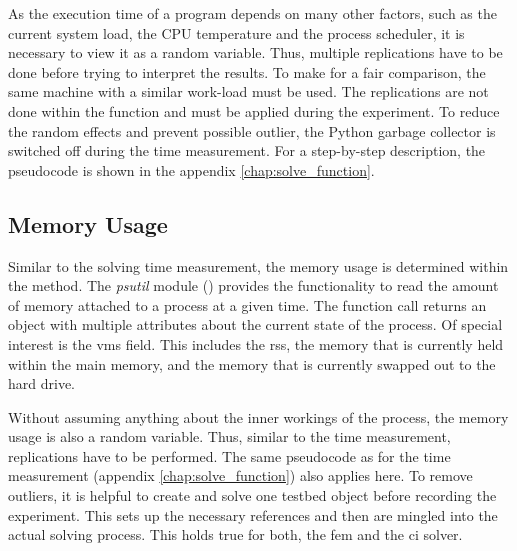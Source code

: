 \documentclass[./\jobname.tex]{subfiles}
\begin{document}
As the execution time of a program depends on many other factors, such as the current system load, the CPU temperature and the process scheduler, it is necessary to view it as a random variable. Thus, multiple replications have to be done before trying to interpret the results. To make for a fair comparison, the same machine with a similar work-load must be used.  The replications are not done within the  function and must be applied during the experiment. To reduce the random effects and prevent possible outlier, the Python garbage collector is switched off during the time measurement. For a step-by-step description, the pseudocode is shown in the appendix \ref{chap:solve_function}. 



\subsection{Memory Usage}
\label{chap:metric_mem}
Similar to the solving time measurement, the memory usage is determined within the  method. The \textit{psutil} module (\cite{rodola_psutil_2020}) provides the functionality to read the amount of memory attached to a process at a given time. The function call  returns an object with multiple attributes about the current state of the process. Of special interest is the \gls{vms} field. This includes the \gls{rss}, the memory that is currently held within the main memory, and the memory that is currently swapped out to the hard drive.

Without assuming anything about the inner workings of the process, the memory usage is also a random variable. Thus, similar to the time measurement, replications have to be performed. The same pseudocode as for the time measurement (appendix \ref{chap:solve_function}) also applies here. To remove outliers, it is helpful to create and solve one testbed object before recording the experiment. This sets up the necessary references and then are mingled into the actual solving process. This holds true for both, the \gls{fem} and the \gls{ci} solver.  
\end{document}
